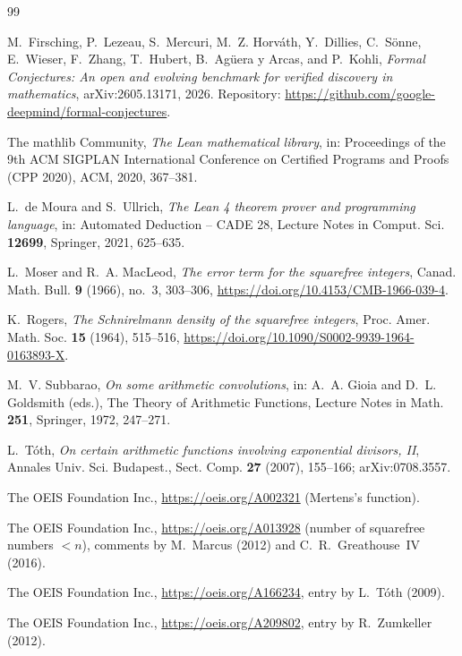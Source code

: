 \documentclass[11pt]{amsart}
\theoremstyle{plain}
\theoremstyle{definition}
\begin{document}
\begin{thebibliography}{99}

M.~Firsching, P.~Lezeau, S.~Mercuri, M.~Z. Horv\'ath, Y.~Dillies, C.~S\"onne, E.~Wieser, F.~Zhang, T.~Hubert, B.~Ag\"uera y Arcas, and P.~Kohli, \emph{Formal Conjectures: An open and evolving benchmark for verified discovery in mathematics}, arXiv:2605.13171, 2026. Repository: \url{https://github.com/google-deepmind/formal-conjectures}.

The mathlib Community, \emph{The Lean mathematical library}, in: Proceedings of the 9th ACM SIGPLAN International Conference on Certified Programs and Proofs (CPP 2020), ACM, 2020, 367--381.

L.~de Moura and S.~Ullrich, \emph{The Lean 4 theorem prover and programming language}, in: Automated Deduction -- CADE 28, Lecture Notes in Comput. Sci. \textbf{12699}, Springer, 2021, 625--635.

L.~Moser and R.~A. MacLeod, \emph{The error term for the squarefree integers}, Canad. Math. Bull. \textbf{9} (1966), no.~3, 303--306, \url{https://doi.org/10.4153/CMB-1966-039-4}.

K.~Rogers, \emph{The Schnirelmann density of the squarefree integers}, Proc. Amer. Math. Soc. \textbf{15} (1964), 515--516, \url{https://doi.org/10.1090/S0002-9939-1964-0163893-X}.

M.~V. Subbarao, \emph{On some arithmetic convolutions}, in: A.~A. Gioia and D.~L. Goldsmith (eds.), The Theory of Arithmetic Functions, Lecture Notes in Math. \textbf{251}, Springer, 1972, 247--271.

L.~T\'oth, \emph{On certain arithmetic functions involving exponential divisors, II}, Annales Univ. Sci. Budapest., Sect. Comp. \textbf{27} (2007), 155--166; arXiv:0708.3557.

The OEIS Foundation Inc., \url{https://oeis.org/A002321} (Mertens's function).

The OEIS Foundation Inc., \url{https://oeis.org/A013928} (number of squarefree numbers $<n$), comments by M.~Marcus (2012) and C.~R.~Greathouse~IV (2016).

The OEIS Foundation Inc., \url{https://oeis.org/A166234}, entry by L.~T\'oth (2009).

The OEIS Foundation Inc., \url{https://oeis.org/A209802}, entry by R.~Zumkeller (2012).

\end{thebibliography}
\end{document}
